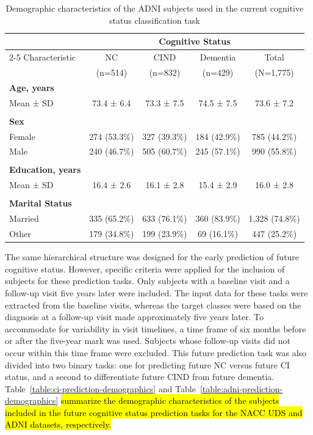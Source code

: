 \begin{table}[htbp]
\centering
\caption{Demographic characteristics of the ADNI subjects used in the current cognitive status classification task}
\label{table:adni-classification-demographics}
\footnotesize
\begin{tabular}{lcccc}
\toprule
 & \multicolumn{4}{c}{Cognitive Status} \\
\cmidrule{2-5}
Characteristic & NC & CIND & Dementia & Total \\
 & (n=514) & (n=832) & (n=429) & (N=1,775) \\
\midrule
\textbf{Age, years} \\
\quad Mean ± \acrshort{SD} & 73.4 ± 6.4 & 73.3 ± 7.5 & 74.5 ± 7.5 & 73.6 ± 7.2 \\
\\
\textbf{Sex} \\
\quad Female & 274 (53.3\%) & 327 (39.3\%) & 184 (42.9\%) & 785 (44.2\%) \\
\quad Male & 240 (46.7\%) & 505 (60.7\%) & 245 (57.1\%) & 990 (55.8\%) \\
\\
\textbf{Education, years} \\
\quad Mean ± SD & 16.4 ± 2.6 & 16.1 ± 2.8 & 15.4 ± 2.9 & 16.0 ± 2.8 \\
\\
\textbf{Marital Status} \\
\quad Married & 335 (65.2\%) & 633 (76.1\%) & 360 (83.9\%) & 1,328 (74.8\%) \\
\quad Other & 179 (34.8\%) & 199 (23.9\%) & 69 (16.1\%) & 447 (25.2\%) \\
\bottomrule
\end{tabular}
\end{table}

The same hierarchical structure was designed for the early prediction of future cognitive status. However, specific criteria were applied for the inclusion of subjects for these prediction tasks. Only subjects with a baseline visit and a follow-up visit five years later were included. The input data for these tasks were extracted from the baseline visits, whereas the target classes were based on the diagnosis at a follow-up visit made approximately five years later. To accommodate for variability in visit timelines, a time frame of six months before or after the five-year mark was used. Subjects whose follow-up visits did not occur within this time frame were excluded. This future prediction task was also divided into two binary tasks: one for predicting future NC versus future CI status, and a second to differentiate future CIND from future dementia. Table~\ref{table:ci-prediction-demographics} and Table~\ref{table:adni-prediction-demographics} \hl{summarize the demographic characteristics of the subjects included in the future cognitive status prediction tasks for the NACC UDS and ADNI datasets, respectively.}

